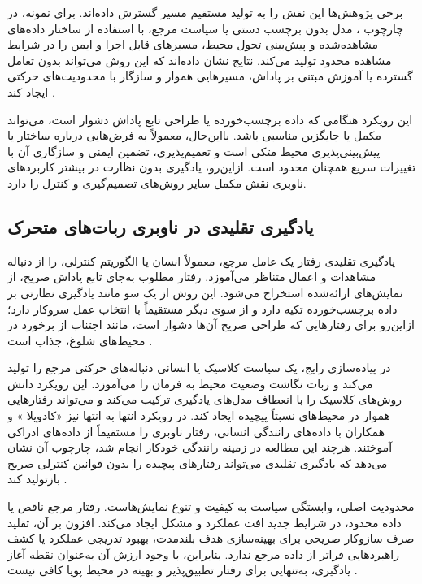 برخی پژوهش‌ها این نقش را به تولید مستقیم مسیر گسترش داده‌اند. برای نمونه، در چارچوب %
، مدل بدون برچسب دستی یا سیاست مرجع، با استفاده از ساختار داده‌های مشاهده‌شده و پیش‌بینی تحول محیط، مسیرهای قابل اجرا و ایمن را در شرایط مشاهده محدود تولید می‌کند. نتایج نشان داده‌اند که این روش می‌تواند بدون تعامل گسترده یا آموزش مبتنی بر پاداش، مسیرهایی هموار و سازگار با محدودیت‌های حرکتی ایجاد کند %
\cite{Luo2025UP3}.

این رویکرد هنگامی که داده برچسب‌خورده یا طراحی تابع پاداش دشوار است، می‌تواند مکمل یا جایگزین مناسبی باشد. بااین‌حال، معمولاً به فرض‌هایی درباره ساختار یا پیش‌بینی‌پذیری محیط متکی است و تعمیم‌پذیری، تضمین ایمنی و سازگاری آن با تغییرات سریع همچنان محدود است. ازاین‌رو، یادگیری بدون نظارت در بیشتر کاربردهای ناوبری نقش مکمل سایر روش‌های تصمیم‌گیری و کنترل را دارد.

\subsection{یادگیری تقلیدی در ناوبری ربات‌های متحرک}

یادگیری تقلیدی%
رفتار یک عامل مرجع، معمولاً انسان یا الگوریتم کنترلی، را از دنباله مشاهدات و اعمال متناظر می‌آموزد. رفتار مطلوب به‌جای تابع پاداش صریح، از نمایش‌های ارائه‌شده استخراج می‌شود. این روش از یک سو مانند یادگیری نظارتی بر داده برچسب‌خورده تکیه دارد و از سوی دیگر مستقیماً با انتخاب عمل سروکار دارد؛ ازاین‌رو برای رفتارهایی که طراحی صریح آن‌ها دشوار است، مانند اجتناب از برخورد در محیط‌های شلوغ، جذاب است %
\cite{argall2009survey}.

در پیاده‌سازی رایج، یک سیاست کلاسیک یا انسانی دنباله‌های حرکتی مرجع را تولید می‌کند و ربات نگاشت وضعیت محیط به فرمان را می‌آموزد. این رویکرد دانش روش‌های کلاسیک را با انعطاف مدل‌های یادگیری ترکیب می‌کند و می‌تواند رفتارهایی هموار در محیط‌های نسبتاً پیچیده ایجاد کند. در رویکرد انتها به انتها نیز «کادویلا%
 »%
و همکاران با داده‌های رانندگی انسانی، رفتار ناوبری را مستقیماً از داده‌های ادراکی آموختند. هرچند این مطالعه در زمینه رانندگی خودکار انجام شد، چارچوب آن نشان می‌دهد که یادگیری تقلیدی می‌تواند رفتارهای پیچیده را بدون قوانین کنترلی صریح بازتولید کند %
\cite{codevilla2018endtoend}.

محدودیت اصلی، وابستگی سیاست به کیفیت و تنوع نمایش‌هاست. رفتار مرجع ناقص یا داده محدود، در شرایط جدید افت عملکرد و مشکل  ایجاد می‌کند. افزون بر آن، تقلید صرف سازوکار صریحی برای بهینه‌سازی هدف بلندمدت، بهبود تدریجی عملکرد یا کشف راهبردهایی فراتر از داده مرجع ندارد. بنابراین، با وجود ارزش آن به‌عنوان نقطه آغاز یادگیری، به‌تنهایی برای رفتار تطبیق‌پذیر و بهینه در محیط پویا کافی نیست %
\cite{Zhu2021}.


